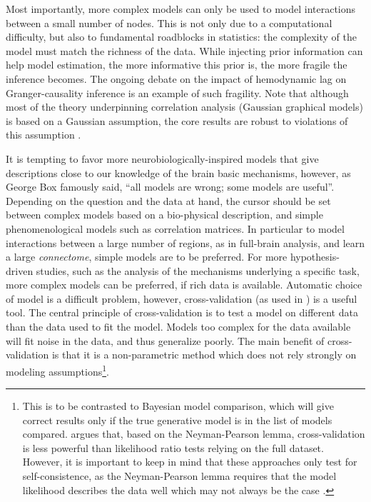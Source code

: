 \documentclass[5p]{elsarticle}
\begin{document}
Most importantly, more complex models can only be used to model
interactions between a small number of nodes. This is not only due to a
computational difficulty, but also to fundamental roadblocks in
statistics: the complexity of the model must match the richness of the
data. While injecting prior information can help model estimation, the
more informative this prior is, the more fragile the inference becomes. The
ongoing debate on the impact of hemodynamic lag on Granger-causality
inference \cite{smith2012a} is an example of such fragility.
Note that although most of the theory underpinning correlation analysis
(Gaussian graphical models) is based on a Gaussian assumption, the core results
are robust to violations of this assumption \cite{ravikumar2011}.

It is tempting to favor more neurobiologically-inspired models that give
descriptions close to our knowledge of the brain basic mechanisms,
however, as George Box famously said, ``all models are wrong; some models
are useful''. Depending on the question and the data at hand, the cursor
should be set between complex models based on a bio-physical description,
and simple phenomenological models such as correlation matrices. In
particular to model interactions between a large number of regions, as in
full-brain analysis, and learn a large \emph{connectome}, simple models
are to be preferred. For more hypothesis-driven studies, such as the
analysis of the mechanisms underlying a specific task, more complex models
can be preferred, if rich data is available. Automatic choice of model is
a difficult problem, however, cross-validation (as used in
\cite{varoquaux2010c,craddock2011,strother2006}) is a useful tool. The
central principle of cross-validation is to test a model on different
data than the data used to fit the model. Models too complex
for the data available will fit noise in the data, and thus generalize
poorly. The main benefit of cross-validation is that it is a
non-parametric method which does not rely strongly on modeling
assumptions\footnote{This is to be contrasted to Bayesian model
comparison, which will give correct results only if the true generative
model is in the list of models compared. \cite{friston2012} argues that,
based on the Neyman-Pearson lemma, cross-validation is less powerful than
likelihood ratio tests relying on the full dataset. However, it is
important to keep in mind that these approaches only test for
self-consistence, as the Neyman-Pearson lemma requires that 
the model likelihood describes the data well which may not always be the
case \cite{lohmann2012}.}.
\end{document}
